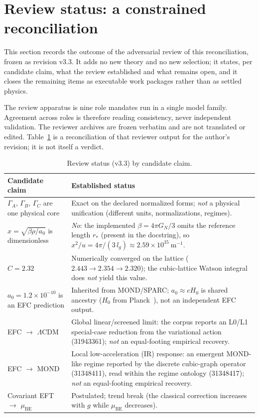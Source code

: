 \documentclass[11pt,a4paper]{article}
\begin{document}
\section{Review status: a constrained reconciliation}
\label{sec:review}

This section records the outcome of the adversarial review of this
reconciliation, frozen as revision v3.3. It adds no new theory and no new
selection; it states, per candidate claim, what the review established and what
remains open, and it closes the remaining items as executable work packages
rather than as settled physics.

The review apparatus is nine role mandates run in a single model family.
Agreement across roles is therefore reading consistency, never independent
validation. The reviewer archives are frozen verbatim and are not translated or
edited. Table~\ref{tab:review} is a reconciliation of that reviewer output for
the author's revision; it is not itself a verdict.

\begin{table}[ht]
\centering
\small
\begin{tabularx}{\textwidth}{@{}>{\raggedright\arraybackslash}p{4.0cm} >{\raggedright\arraybackslash}X@{}}
\toprule
Candidate claim & Established status \\
\midrule
$\Gamma_A$, $\Gamma_B$, $\Gamma_C$ are one physical core &
Exact on the declared normalized forms; \emph{not} a physical unification
(different units, normalizations, regimes). \\
$x = \sqrt{\beta\rho/a_0}$ is dimensionless &
\emph{No}: the implemented $\beta = 4\pi G_N/3$ omits the reference length
$r_*$ (present in the docstring), so $x^2/u = 4\pi/(3\,l_g) \approx
2.59\times10^{35}\ \mathrm{m^{-1}}$. \\
$C = 2.32$ &
Numerically converged on the lattice ($2.443 \to 2.354 \to 2.320$); the cubic-lattice Watson integral~\cite{watson1939} does \emph{not} yield this value. \\
$a_0 = 1.2\times10^{-10}$ is an EFC prediction &
Inherited from MOND/SPARC; $a_0 \approx cH_0$ is shared ancestry ($H_0$ from Planck~\cite{planck2018}), not an
independent EFC output. \\
EFC $\to$ $\Lambda$CDM &
Global linear/screened limit: the corpus reports an L0/L1 special-case reduction from the variational action (31943361); \emph{not} an equal-footing empirical recovery. \\
EFC $\to$ MOND &
Local low-acceleration (IR) response: an emergent MOND-like regime reported by the discrete cubic-graph operator (31348411), read within the regime ontology (31348417); \emph{not} an equal-footing empirical recovery. \\
Covariant EFT $\to$ $\mu_{\mathrm{BE}}$ &
Postulated; trend break (the classical correction increases with $g$ while
$\mu_{\mathrm{BE}}$ decreases). \\
\bottomrule
\end{tabularx}
\caption{Review status (v3.3) by candidate claim.}
\label{tab:review}
\end{table}
\end{document}
